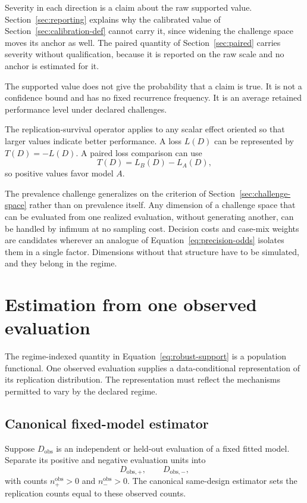 \documentclass[11pt]{article}
\theoremstyle{remark}
\begin{document}
Severity in each direction is a claim about the raw supported value. Section~\ref{sec:reporting} explains why the calibrated value of Section~\ref{sec:calibration-def} cannot carry it, since widening the challenge space moves its anchor as well. The paired quantity of Section~\ref{sec:paired} carries severity without qualification, because it is reported on the raw scale and no anchor is estimated for it.

The supported value does not give the probability that a claim is true. It is not a confidence bound and has no fixed recurrence frequency. It is an average retained performance level under declared challenges.

The replication-survival operator applies to any scalar effect oriented so that larger values indicate better performance. A loss $L(D)$ can be represented by $T(D)=-L(D)$. A paired loss comparison can use
\[
T(D)=L_B(D)-L_A(D),
\]
so positive values favor model $A$.

The prevalence challenge generalizes on the criterion of Section~\ref{sec:challenge-space} rather than on prevalence itself. Any dimension of a challenge space that can be evaluated from one realized evaluation, without generating another, can be handled by infimum at no sampling cost. Decision costs and case-mix weights are candidates wherever an analogue of Equation~\eqref{eq:precision-odds} isolates them in a single factor. Dimensions without that structure have to be simulated, and they belong in the regime.

\section{Estimation from one observed evaluation}
\label{sec:estimation}

The regime-indexed quantity in Equation~\eqref{eq:robust-support} is a population functional. One observed evaluation supplies a data-conditional representation of its replication distribution. The representation must reflect the mechanisms permitted to vary by the declared regime.

\subsection{Canonical fixed-model estimator}

Suppose $D_{\mathrm{obs}}$ is an independent or held-out evaluation of a fixed fitted model. Separate its positive and negative evaluation units into
\[
D_{\mathrm{obs},+},
\qquad
D_{\mathrm{obs},-},
\]
with counts $n_+^{\mathrm{obs}}>0$ and $n_-^{\mathrm{obs}}>0$. The canonical same-design estimator sets the replication counts equal to these observed counts.
\end{document}
